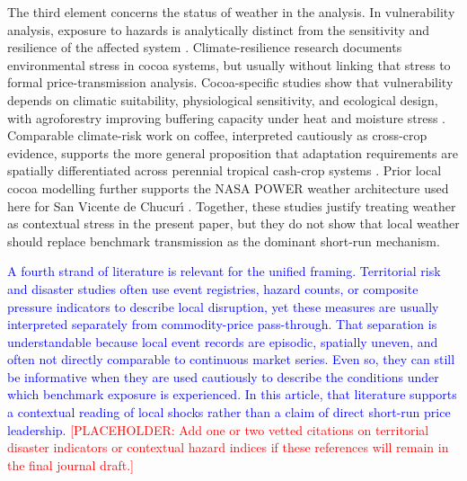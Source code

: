 \documentclass[11pt]{article}
\newcommand{\vTwo}[1]{\textcolor{blue}{#1}}
\newcommand{\placeholder}[1]{\textcolor{red}{[PLACEHOLDER: #1]}}
\begin{document}
The third element concerns the status of weather in the analysis. In vulnerability analysis, exposure to hazards is analytically distinct from the sensitivity and resilience of the affected system \citep{Turner2003,Adger2006}. Climate-resilience research documents environmental stress in cocoa systems, but usually without linking that stress to formal price-transmission analysis. Cocoa-specific studies show that vulnerability depends on climatic suitability, physiological sensitivity, and ecological design, with agroforestry improving buffering capacity under heat and moisture stress \citep{Schroth2016,Lahive2019,Niether2020}. Comparable climate-risk work on coffee, interpreted cautiously as cross-crop evidence, supports the more general proposition that adaptation requirements are spatially differentiated across perennial tropical cash-crop systems \citep{Koh2020,Laderach2016}. Prior local cocoa modelling further supports the NASA POWER weather architecture used here for San Vicente de Chucur\'{\i} \citep{talero_sarmiento_etal_2025}. Together, these studies justify treating weather as contextual stress in the present paper, but they do not show that local weather should replace benchmark transmission as the dominant short-run mechanism.

\vTwo{A fourth strand of literature is relevant for the unified framing. Territorial risk and disaster studies often use event registries, hazard counts, or composite pressure indicators to describe local disruption, yet these measures are usually interpreted separately from commodity-price pass-through. That separation is understandable because local event records are episodic, spatially uneven, and often not directly comparable to continuous market series. Even so, they can still be informative when they are used cautiously to describe the conditions under which benchmark exposure is experienced. In this article, that literature supports a contextual reading of local shocks rather than a claim of direct short-run price leadership.} \placeholder{Add one or two vetted citations on territorial disaster indicators or contextual hazard indices if these references will remain in the final journal draft.}
\end{document}
